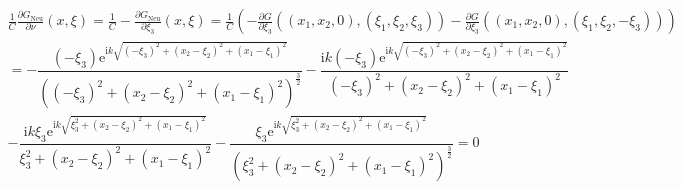 \begin{solution}
\begin{enumerate}[label = (\roman*)]
\begin{align*}
  \frac{1}{C}\frac{\partial G_\mathrm{Neu}}{\partial \nu}(x, \xi)
  =
  \frac{1}{C}-\frac{\partial G_\mathrm{Neu}}{\partial \xi_3}(x, \xi)
  =
  \frac{1}{C}(-\frac{\partial G}{\partial \xi_3}((x_1,x_2,0),(\xi_1, \xi_2, \xi_3)) -\frac{\partial G}{\partial \xi_3}((x_1,x_2,0),(\xi_1,\xi_2, -\xi_3))) \\
  =
  -\dfrac{\left(-{\xi}_3\right)\mathrm{e}^{\mathrm{i}k\sqrt{\left(-{\xi}_3\right)^2+\left(x_2-{\xi}_2\right)^2+\left(x_1-{\xi}_1\right)^2}}}{\left(\left(-{\xi}_3\right)^2+\left(x_2-{\xi}_2\right)^2+\left(x_1-{\xi}_1\right)^2\right)^\frac{3}{2}}-\dfrac{\mathrm{i}k\left(-{\xi}_3\right)\mathrm{e}^{\mathrm{i}k\sqrt{\left(-{\xi}_3\right)^2+\left(x_2-{\xi}_2\right)^2+\left(x_1-{\xi}_1\right)^2}}}{\left(-{\xi}_3\right)^2+\left(x_2-{\xi}_2\right)^2+\left(x_1-{\xi}_1\right)^2} \\
  -
  \dfrac{\mathrm{i}k\xi_3\mathrm{e}^{\mathrm{i}k\sqrt{\xi_3^2+\left(x_2-{\xi}_2\right)^2+\left(x_1-{\xi}_1\right)^2}}}{\xi_3^2+\left(x_2-{\xi}_2\right)^2+\left(x_1-{\xi}_1\right)^2}-\dfrac{\xi_3\mathrm{e}^{\mathrm{i}k\sqrt{\xi_3^2+\left(x_2-{\xi}_2\right)^2+\left(x_1-{\xi}_1\right)^2}}}{\left(\xi_3^2+\left(x_2-{\xi}_2\right)^2+\left(x_1-{\xi}_1\right)^2\right)^\frac{3}{2}}
  =
  0
\end{align*}
\end{enumerate}
\end{solution}

